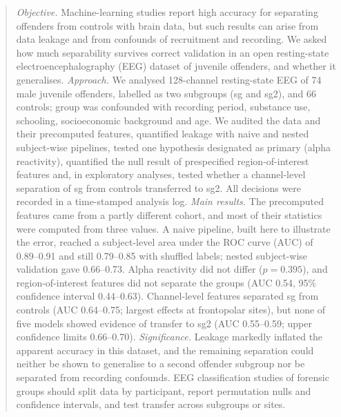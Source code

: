 \documentclass{iopjournal}
\begin{document}
\begin{abstract}
\textit{Objective.} Machine-learning studies report high accuracy for separating offenders from controls with brain data, but such results can arise from data leakage and from confounds of recruitment and recording. We asked how much separability survives correct validation in an open resting-state electroencephalography (EEG) dataset of juvenile offenders, and whether it generalises.
\textit{Approach.} We analysed 128-channel resting-state EEG of 74 male juvenile offenders, labelled as two subgroups (sg and sg2), and 66 controls; group was confounded with recording period, substance use, schooling, socioeconomic background and age. We audited the data and their precomputed features, quantified leakage with naive and nested subject-wise pipelines, tested one hypothesis designated as primary (alpha reactivity), quantified the null result of prespecified region-of-interest features and, in exploratory analyses, tested whether a channel-level separation of sg from controls transferred to sg2. All decisions were recorded in a time-stamped analysis log.
\textit{Main results.} The precomputed features came from a partly different cohort, and most of their statistics were computed from three values. A naive pipeline, built here to illustrate the error, reached a subject-level area under the ROC curve (AUC) of 0.89--0.91 and still 0.79--0.85 with shuffled labels; nested subject-wise validation gave 0.66--0.73. Alpha reactivity did not differ ($p = 0.395$), and region-of-interest features did not separate the groups (AUC 0.54, 95\% confidence interval 0.44--0.63). Channel-level features separated sg from controls (AUC 0.64--0.75; largest effects at frontopolar sites), but none of five models showed evidence of transfer to sg2 (AUC 0.55--0.59; upper confidence limits 0.66--0.70).
\textit{Significance.} Leakage markedly inflated the apparent accuracy in this dataset, and the remaining separation could neither be shown to generalise to a second offender subgroup nor be separated from recording confounds. EEG classification studies of forensic groups should split data by participant, report permutation nulls and confidence intervals, and test transfer across subgroups or sites.
\end{abstract}








\end{document}
